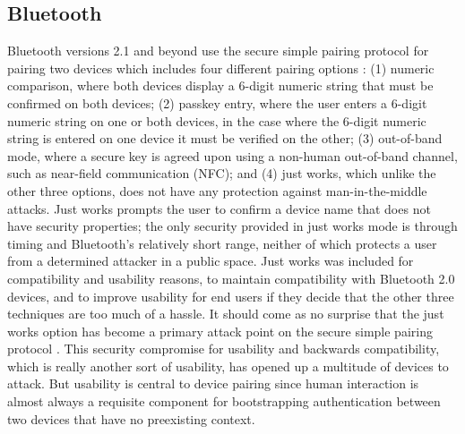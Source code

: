 \documentclass[12pt]{report}
\begin{document}
\subsection{Bluetooth}
Bluetooth versions 2.1 and beyond use the secure simple pairing protocol for pairing two devices which includes four different pairing options \cite{Bluetooth40Spec2010,SimplePairingAnalysisBluetooth4Phan2010,FormalAuthAnalysisBluetoothChang2007}: (1) numeric comparison, where both devices display a 6-digit numeric string that must be confirmed on both devices; (2) passkey entry, where the user enters a 6-digit numeric string on one or both devices, in the case where the 6-digit numeric string is entered on one device it must be verified on the other; (3) out-of-band mode, where a secure key is agreed upon using a non-human out-of-band channel, such as near-field communication (NFC); and (4) just works, which unlike the other three options, does not have any protection against man-in-the-middle attacks. Just works prompts the user to confirm a device name that does not have security properties; the only security provided in just works mode is through timing and Bluetooth's relatively short range, neither of which protects a user from a determined attacker in a public space. Just works was included for compatibility and usability reasons, to maintain compatibility with Bluetooth 2.0 devices, and to improve usability for end users \cite{BluetoothInterfaceFlowSecureSimplePairing2007} if they decide that the other three techniques are too much of a hassle. It should come as no surprise that the just works option has become a primary attack point on the secure simple pairing protocol \cite{BluetoothSSPAttackJustWorksHaataja2008}. This security compromise for usability and backwards compatibility, which is really another sort of usability, has opened up a multitude of devices to attack. But usability is central to device pairing since human interaction is almost always a requisite component for bootstrapping authentication between two devices that have no preexisting context. \par
\end{document}
